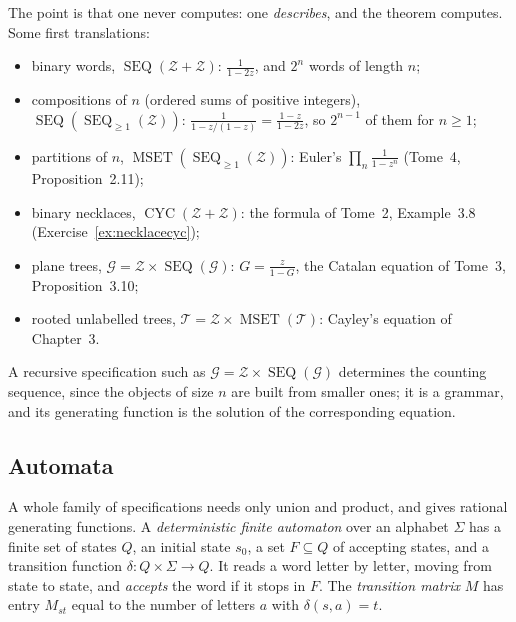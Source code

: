 The point is that one never computes: one \emph{describes}, and the theorem computes. Some first translations:
\begin{itemize}
\item binary words, $\operatorname{SEQ}(\mathcal Z+\mathcal Z)$: $\frac1{1-2z}$, and $2^n$ words of length $n$;
\item compositions of $n$ (ordered sums of positive integers), $\operatorname{SEQ}(\operatorname{SEQ}_{\ge1}(\mathcal Z))$: $\frac1{1-z/(1-z)}=\frac{1-z}{1-2z}$, so $2^{n-1}$ of them for $n\ge1$;
\item partitions of $n$, $\operatorname{MSET}(\operatorname{SEQ}_{\ge1}(\mathcal Z))$: Euler's $\prod_n\frac1{1-z^n}$ (Tome~4, Proposition~2.11);
\item binary necklaces, $\operatorname{CYC}(\mathcal Z+\mathcal Z)$: the formula of Tome~2, Example~3.8 (Exercise~\ref{ex:necklacecyc});
\item plane trees, $\mathcal G=\mathcal Z\times\operatorname{SEQ}(\mathcal G)$: $G=\frac z{1-G}$, the Catalan equation of Tome~3, Proposition~3.10;
\item rooted unlabelled trees, $\mathcal T=\mathcal Z\times\operatorname{MSET}(\mathcal T)$: Cayley's equation of Chapter~3.
\end{itemize}
A recursive specification such as $\mathcal G=\mathcal Z\times\operatorname{SEQ}(\mathcal G)$ determines the counting sequence, since the objects of size $n$ are built from
smaller ones; it is a grammar, and its generating function is the solution of the corresponding equation.

\subsection*{Automata}

A whole family of specifications needs only union and product, and gives rational generating functions. A
\emph{deterministic finite automaton} over an alphabet $\Sigma$ has a finite set of states $Q$, an initial state $s_0$, a set $F\subseteq Q$ of accepting
states, and a transition function $\delta:Q\times\Sigma\to Q$. It reads a word letter by letter, moving from state to state, and \emph{accepts} the word if it
stops in $F$. The \emph{transition matrix} $M$ has entry $M_{st}$ equal to the number of letters $a$ with $\delta(s,a)=t$.

